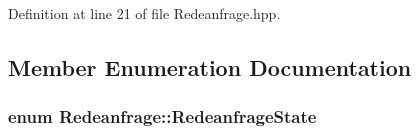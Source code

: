 Definition at line 21 of file Redeanfrage.\+hpp.



\subsection{Member Enumeration Documentation}
\hypertarget{class_redeanfrage_ac4156718456ad89ed6d32e281a8bac18}{}
\subsubsection[{Redeanfrage\+State}]{\setlength{\rightskip}{0pt plus 5cm}enum {\bf Redeanfrage\+::\+Redeanfrage\+State}}\label{class_redeanfrage_ac4156718456ad89ed6d32e281a8bac18}

